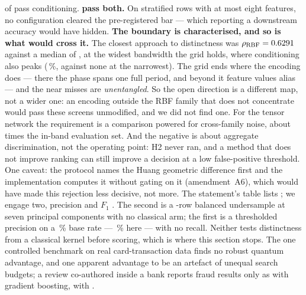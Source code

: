 \ClaimScreenPassConditioning{} of \ClaimScreenConfigs{} pass conditioning.
\textbf{\ClaimScreenPassBoth{} pass both.} On \ClaimScreenSamples{} stratified rows with at most
eight features, no configuration cleared the pre-registered bar --- which reporting a downstream
accuracy would have hidden.
\textbf{The boundary is characterised, and so is what would cross it.} The closest approach to
distinctness was $\rho_{\mathrm{RBF}} = 0.6291$ against a median of
\ClaimScreenMedianRbf{}, at the widest bandwidth the grid holds, where conditioning also peaks
(\ClaimScreenCondPassWidest\,\%, against none at the narrowest). The grid ends where the
encoding does --- there the phase spans one full period, and beyond it feature values alias ---
and the near misses are \emph{unentangled}. So the open direction is a different map, not a
wider one: an encoding outside the RBF family that does not concentrate would pass these screens
unmodified, and we did not find one. For the tensor network the requirement is a comparison
powered for cross-family noise, about \ClaimMdeSampleFactor{} times the in-band evaluation set.
And the negative is about aggregate discrimination, not the operating point: H2 never ran, and a
method that does not improve ranking can still improve a decision at a low false-positive
threshold. One caveat: the protocol names the
Huang geometric difference first and the implementation computes it without gating on it
(amendment~A6), which would have made this rejection less decisive, not more. The statement's  table lists
; we engage two,  precision and
 $F_1$ . The second is a
-row balanced undersample at seven principal components with no classical arm; the
first is a thresholded precision on a \,\% base rate --- \ClaimTestFraudRate\,\%
here --- with no recall. Neither tests distinctness from a classical kernel before scoring,
which is where this section stops. The one controlled benchmark on real card-transaction data
 finds no robust quantum advantage, and one apparent advantage to be an
artefact of unequal search budgets; a  review co-authored inside a bank
 reports fraud results only as  with
gradient boosting, with .

